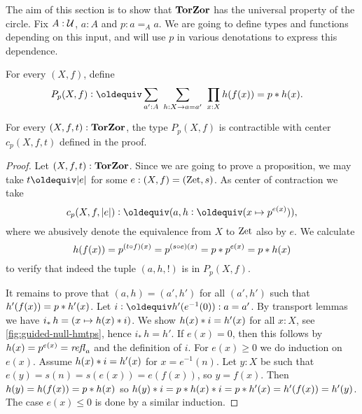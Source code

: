 \documentclass[a4,12pt]{amsart}
\begin{document}
The aim of this section is to show that $\mathbf{TorZor}$ has the
universal property of the circle. Fix $A:\mathcal{U}$, $a:A$ and $p: a=_A a$. 
We are going to define types and
functions depending on this input, and will use $p$ in various
denotations to express this dependence. 

\begin{definition}\label{def:TBN}
For every $(X,f)$, define
\begin{align*}\label{eq:TBD}
P_p(X,f)&\defeq \sum_{a':A}~\sum_{h:X\to a=a'}~\prod_{x:X} h(f(x))=p\ct h(x).
\end{align*}
\end{definition}

\begin{lemma}\label{lem:guided-null-hmtps}
For every $(X,f,t):\mathbf{TorZor}$, the type $P_p(X,f)$ is contractible
with center $c_p(X,f,t)$ defined in the proof.
\end{lemma}
\begin{proof}
  Let $(X,f,t):\mathbf{TorZor}$. Since we are going to prove a proposition, 
  we may take $t\jdeq\trunc e$ for some $e : (X,f)=(\mathrm{Zet},s)$. As center of
  contraction we take
\[
c_p(X,f,\trunc{e})\defeq (a, h\defeq(x\mapsto p^{e(x)})),
\]
where we 
abusively denote the equivalence from $X$ to $\mathrm{Zet}$ also by $e$.
We calculate 
\[
h(f(x))=p^{(t\circ f)(x)}=p^{(s\circ e)(x)}=p* p^{e(x)}=p* h(x)
\]
to verify that indeed the tuple $(a,h,!)$ is in $P_p(X,f)$.

It remains to prove that $(a,h)=(a',h')$ for all $(a',h')$ such that
$h'(f(x))=p* h'(x)$. Let $i\defeq h'(e^{-1}(0)): a=a'$.
By transport lemmas we have $i_*\, h = (x\mapsto h(x)* i)$.
We show $h(x)* i= h'(x)$ for all $x:X$, 
see \cref{fig:guided-null-hmtps}, hence $i_*\, h = h'$.
If $e(x)=0$, then this follows by $h(x)=p^{e(x)}=\mathop{{\it refl}_{a}}$ and the
definition of $i$. For $e(x)\geq 0$ we do induction on $e(x)$. 
Assume $h(x)* i= h'(x)$ for $x=e^{-1}(n)$.
Let $y:X$ be such that $e(y)=s(n)=s(e(x))=e(f(x))$, so $y=f(x)$.
Then $h(y) = h(f(x)) = p * h(x)$ so 
$h(y)* i= p * h(x)* i = p* h'(x) = h'(f(x)) = h'(y)$.
The case $e(x)\leq 0$ is done by a similar induction.
\end{proof}
\end{document}

